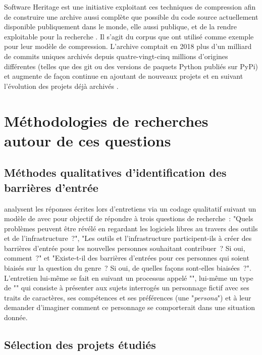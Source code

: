 Software Heritage est une initiative exploitant ces
techniques de compression afin de construire une archive aussi complète que possible du code source
actuellement disponible publiquement dans le monde, elle aussi publique, et de la rendre exploitable pour la
recherche . Il s'agit du corpus que \textcite{swh-graph-2020} ont utilisé comme
exemple pour leur modèle de compression. L'archive comptait en 2018 plus d'un milliard de \glspl{commit}
uniques archivés depuis quatre-vingt-cinq millions d'origines différentes (telles que des 
\gls{git} ou des versions de paquets Python publiés sur PyPi) et augmente de
façon continue en ajoutant de nouveaux projets et en suivant l'évolution des projets déjà archivés
.

\section{Méthodologies de recherches autour de ces questions}

\subsection{Méthodes qualitatives d'identification des barrières d'entrée}

\textcite[p.~1006]{barriers-2018} analysent les réponses écrites lors d'entretiens via un codage qualitatif
suivant un modèle de  avec pour objectif de répondre à trois questions de
recherche : "Quels problèmes peuvent être révélé en regardant les logiciels libres au travers des outils et de
l'infrastructure ?", "Les outils et l'infrastructure participent-ils à créer des barrières d'entrée pour les
nouvelles personnes souhaitant contribuer ? Si oui, comment ?" et "Existe-t-il des barrières d'entrées pour
ces personnes qui soient biaisés sur la question du genre ? Si oui, de quelles façons sont-elles biaisées ?".
L'entretien lui-même se fait en suivant un processus appelé "", lui-même un type de
"" qui consiste à présenter aux sujets interrogés un personnage fictif avec ses
traits de caractères, ses compétences et ses préférences (une "\emph{persona}") et à leur demander d'imaginer
comment ce personnage se comporterait dans une situation donnée.

\subsection{Sélection des projets étudiés}

